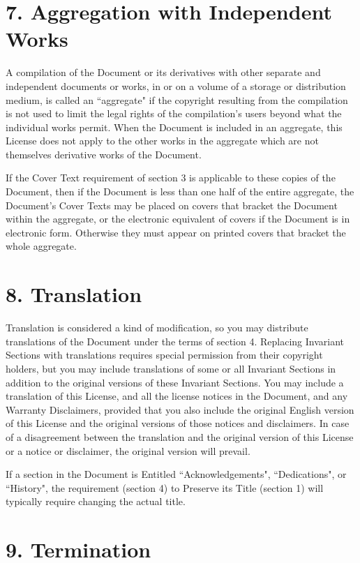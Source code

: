 \documentclass[12pt]{book}
\numberwithin{exc}{section}
\numberwithin{figure}{section}
\numberwithin{equation}{theorem}
\begin{document}
\section{7. Aggregation with Independent Works}


A compilation of the Document or its derivatives with other separate
and independent documents or works, in or on a volume of a storage or
distribution medium, is called an ``aggregate" if the copyright
resulting from the compilation is not used to limit the legal rights
of the compilation's users beyond what the individual works permit.
When the Document is included in an aggregate, this License does not
apply to the other works in the aggregate which are not themselves
derivative works of the Document.

If the Cover Text requirement of section 3 is applicable to these
copies of the Document, then if the Document is less than one half of
the entire aggregate, the Document's Cover Texts may be placed on
covers that bracket the Document within the aggregate, or the
electronic equivalent of covers if the Document is in electronic form.
Otherwise they must appear on printed covers that bracket the whole
aggregate.

\section{8. Translation}


Translation is considered a kind of modification, so you may
distribute translations of the Document under the terms of section 4.
Replacing Invariant Sections with translations requires special
permission from their copyright holders, but you may include
translations of some or all Invariant Sections in addition to the
original versions of these Invariant Sections.  You may include a
translation of this License, and all the license notices in the
Document, and any Warranty Disclaimers, provided that you also include
the original English version of this License and the original versions
of those notices and disclaimers.  In case of a disagreement between
the translation and the original version of this License or a notice
or disclaimer, the original version will prevail.

If a section in the Document is Entitled ``Acknowledgements",
``Dedications", or ``History", the requirement (section 4) to Preserve
its Title (section 1) will typically require changing the actual
title.

\section{9. Termination}
\end{document}

